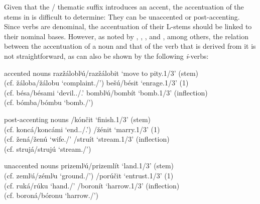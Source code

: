 \documentclass[output=paper,colorlinks,citecolor=black,koreanfont]{langscibook}
\begin{document}
Given that the / thematic suffix introduces an accent, the accentuation of the  stems in  is difficult to determine: They can be unaccented or post-accenting. Since  verbs are denominal, the accentuation of their L-stems should be linked to their nominal bases. However, as noted by \citet{Redkin1965}, \citet[344--347]{Halle1973}, \citet[107]{Zaliznjak1985}, and \citet{Gladney1995}, among others, the relation between the accentuation of a noun and that of the verb that is derived from it is not straightforward, as can also be shown by the following \textit{i}-verbs:

\largerpage
\ea\label{mat:ex:iAccentedNouns} accented nouns
\ea razžáloblʲú/razžálobit ‘move to pity.{1\SG}/{3\SG}’ \hfill (stem)\\
(cf. žáloba/žálobu ‘complaint.\NOM/\ACC’) 
\ex bešú/bésit ‘enrage.{1\SG}/{3\SG}’ \hfill ({1\SG})\\
(cf. bésa/bésami ‘devil.{\SG.\GEN}/{\PL.\INS}’
\ex bomblʲú/bombít ‘bomb.{1\SG}/{3\SG}’ \hfill (inflection)\\
(cf. bómba/bómbu ‘bomb.\NOM/\ACC’)
\z
\z

\ea post-accenting nouns
/{kónčit} ‘finish.{1\SG}/{3\SG}’ \hfill (stem)\\
(cf. {koncá}/{koncámi} ‘end.{\SG.\GEN}/{\PL.\INS}’) 
/{žénit} ‘marry.{1\SG}/{3\SG}’ \hfill ({1\SG})\\
(cf. {žená}/{ženú} ‘wife.{\NOM}/{\ACC}’
/{struít} ‘stream.{1\SG}/{3\SG}’ \hfill (inflection)\\
(cf. {strujá}/{strujú} ‘stream.{\NOM}/{\ACC}’) 
\z
\z

\ea\label{mat:ex:iUnaccentedNouns} unaccented nouns
\ea prizemlʲú/prizemlít ‘land.{1\SG}/{3\SG}’ \hfill (stem)\\
(cf. zemlʲá/zémlʲu ‘ground.{\NOM}/{\ACC}’) 
/{porúčit} ‘entrust.{1\SG}/{3\SG}’ \hfill ({1\SG})\\
(cf. {ruká}/{rúku} ‘hand.{\NOM}/{\ACC}’
/{boronít} ‘harrow.{1\SG}/{3\SG}’ \hfill (inflection)\\
(cf. {boroná}/{bóronu} ‘harrow.{\NOM}/{\ACC}’) 
\z
\z
\end{document}
